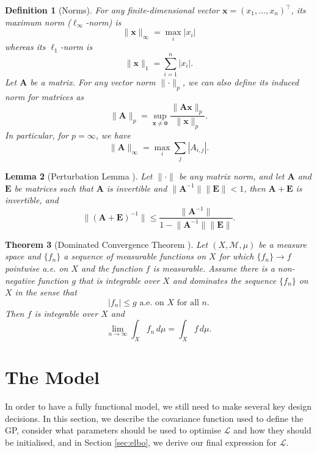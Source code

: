 \documentclass{mpaper}
\newtheorem{theorem}{Theorem}[section]
\newtheorem{lemma}[theorem]{Lemma}
\newtheorem{definition}[theorem]{Definition}
\begin{document}
\begin{definition}[Norms]
  For any finite-dimensional vector $\mathbf{x} = (x_1, \dots, x_n)^\intercal$,
  its \emph{maximum norm} (\emph{$\ell_\infty$-norm}) is
  \[
    \lVert \mathbf{x} \rVert_\infty = \max_i |x_i|
  \]
  whereas its \emph{$\ell_1$-norm} is
  \[
    \lVert \mathbf{x} \rVert_1 = \sum_{i = 1}^n |x_i|.
  \]
  Let $\mathbf{A}$ be a matrix. For any vector norm $\lVert
  \cdot \rVert_p$, we can also define its \emph{induced norm} for matrices as
  \[
    \lVert \mathbf{A} \rVert_p = \sup_{\mathbf{x} \ne \mathbf{0}} \frac{\lVert
      \mathbf{Ax} \rVert_p}{\lVert \mathbf{x} \rVert_p}.
  \]
  In particular, for $p = \infty$, we have
  \[
    \lVert \mathbf{A} \rVert_\infty = \max_i \sum_{j} |A_{i,j}|.
  \]
\end{definition}

\begin{lemma}[Perturbation Lemma
  \cite{layton2014numerical}] \label{lemma:perturbation}
  Let $\lVert \cdot \rVert$ be any matrix norm, and let $\mathbf{A}$ and
  $\mathbf{E}$ be matrices such that $\mathbf{A}$ is invertible and $\lVert
  \mathbf{A}^{-1} \rVert \lVert \mathbf{E} \rVert < 1$, then $\mathbf{A} +
  \mathbf{E}$ is invertible, and
  \[
    \lVert (\mathbf{A} + \mathbf{E})^{-1} \rVert \le \frac{\lVert
      \mathbf{A}^{-1} \rVert}{1 - \lVert \mathbf{A}^{-1} \rVert \lVert
      \mathbf{E} \rVert}.
  \]
\end{lemma}

\begin{theorem}[Dominated Convergence Theorem
  \cite{royden2010real}] \label{thm:lebesgue}
  Let $(X, \mathcal{M}, \mu)$ be a measure space and $\{ f_n \}$ a sequence of
  measurable functions on $X$ for which $\{ f_n \} \to f$ pointwise a.e. on $X$
  and the function $f$ is measurable. Assume there is a non-negative function
  $g$ that is integrable over $X$ and dominates the sequence $\{ f_n \}$ on $X$
  in the sense that
  \[
    |f_n| \le g \text{ a.e. on $X$ for all $n$.}
  \]
  Then $f$ is integrable over $X$ and
  \[
    \lim_{n \to \infty} \int_X f_n\,d\mu = \int_X f\,d\mu.
  \]
\end{theorem}

\section{The Model} \label{sec:model}

In order to have a fully functional model, we still need to make several key
design decisions. In this section, we describe the covariance function used to
define the GP, consider what parameters should be used to optimise $\mathcal{L}$
and how they should be initialised, and in Section \ref{sec:elbo}, we derive our
final expression for $\mathcal{L}$.
\end{document}
